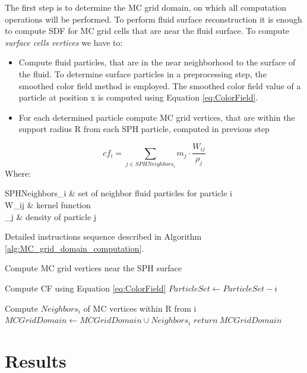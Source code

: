 The first step is to determine the MC grid domain, on which all computation operations will be performed. To perform fluid surface reconstruction it is enough to compute SDF for MC grid cells that are near the fluid surface. To compute \emph{surface cells vertices} we have to:
\begin{itemize}
		\item Compute fluid particles, that are in the near neighborhood to the surface of the fluid. To determine surface particles in a preprocessing step, the smoothed color field method \cite{ColorField} is employed.  The smoothed color field value of a particle at position x is computed using Equation \ref{eq:ColorField}.
		\item For each determined particle compute MC grid vertices, that are within the support radius R from each SPH particle, computed in previous step 
\end{itemize}
\begin{equation} \label{eq:ColorField}
	cf_i = \sum_{j\in SPHNeighbors_i}{m_j \cdot \dfrac{W_{ij}}{\rho_j}}
\end{equation}
Where:
\begin{conditions}
	SPHNeighbors_i & set of neighbor fluid particles for particle i\\
	W_{ij} & kernel function\\
	\rho_j & density of particle j\\
\end{conditions}
Detailed instructions sequence described in Algorithm \ref{alg:MC_grid_domain_computation}.
\begin{algorithm}
	\scriptsize
	\caption{Compute MC grid vertices near the SPH surface}
	\label{alg:MC_grid_domain_computation}
	\begin{algorithmic}
			\State Compute CF using Equation \ref{eq:ColorField}
				\State $ParticleSet \gets ParticleSet - i$
			\EndIf

		\EndFor
			\State Compute $Neighbors_i$ of MC vertices within R from  i
			\State $MCGridDomain \gets MCGridDomain \cup Neighbors_i$
		\EndFor
		\State $return\ MCGridDomain$
	\end{algorithmic}
\end{algorithm} 

\section{Results}


